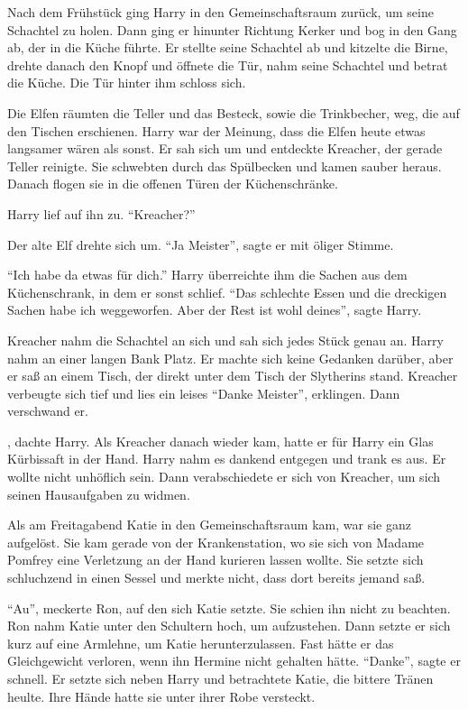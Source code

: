 Nach dem Frühstück ging Harry in den Gemeinschaftsraum zurück, um seine Schachtel zu holen. Dann ging er hinunter Richtung Kerker und bog in den Gang ab, der in die Küche führte. Er stellte seine Schachtel ab und kitzelte die Birne, drehte danach den Knopf und öffnete die Tür, nahm seine Schachtel und betrat die Küche. Die Tür hinter ihm schloss sich.

Die Elfen räumten die Teller und das Besteck, sowie die Trinkbecher, weg, die auf den Tischen erschienen. Harry war der Meinung, dass die Elfen heute etwas langsamer wären als sonst. Er sah sich um und entdeckte Kreacher, der gerade Teller reinigte. Sie schwebten durch das Spülbecken und kamen sauber heraus. Danach flogen sie in die offenen Türen der Küchenschränke.

Harry lief auf ihn zu. \enquote{Kreacher?}

Der alte Elf drehte sich um. \enquote{Ja Meister}, sagte er mit öliger Stimme.

\enquote{Ich habe da etwas für dich.} Harry überreichte ihm die Sachen aus dem Küchenschrank, in dem er sonst schlief. \enquote{Das schlechte Essen und die dreckigen Sachen habe ich weggeworfen. Aber der Rest ist wohl deines}, sagte Harry.

Kreacher nahm die Schachtel an sich und sah sich jedes Stück genau an. Harry nahm an einer langen Bank Platz. Er machte sich keine Gedanken darüber, aber er saß an einem Tisch, der direkt unter dem Tisch der Slytherins stand. Kreacher verbeugte sich tief und lies ein leises \enquote{Danke Meister}, erklingen. Dann verschwand er.

, dachte Harry. Als Kreacher danach wieder kam, hatte er für Harry ein Glas Kürbissaft in der Hand. Harry nahm es dankend entgegen und trank es aus. Er wollte nicht unhöflich sein. Dann verabschiedete er sich von Kreacher, um sich seinen Hausaufgaben zu widmen.

\trenn

Als am Freitagabend Katie in den Gemeinschaftsraum kam, war sie ganz aufgelöst. Sie kam gerade von der Krankenstation, wo sie sich von Madame Pomfrey eine Verletzung an der Hand kurieren lassen wollte. Sie setzte sich schluchzend in einen Sessel und merkte nicht, dass dort bereits jemand saß.

\enquote{Au}, meckerte Ron, auf den sich Katie setzte. Sie schien ihn nicht zu beachten. Ron nahm Katie unter den Schultern hoch, um aufzustehen. Dann setzte er sich kurz auf eine Armlehne, um Katie herunterzulassen. Fast hätte er das Gleichgewicht verloren, wenn ihn Hermine nicht gehalten hätte. \enquote{Danke}, sagte er schnell. Er setzte sich neben Harry und betrachtete Katie, die bittere Tränen heulte. Ihre Hände hatte sie unter ihrer Robe versteckt.


